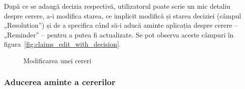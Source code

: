 	După ce se adaugă decizia respectivă, utilizatorul poate scrie un mic detaliu despre cerere, a-i modifica starea, ce implicit modifică și starea deciziei (câmpul „Resolution”) și de a specifica când să-i aducă aminte aplicația despre cerere -- „Reminder” -- pentru a putea fi actualizate.
	Se pot observa aceste câmpuri în figura~\ref{fig:claims_edit_with_decision}.
	\begin{figure}
		\centering
		\caption{Modificarea unei cereri}
	\end{figure}

	\subsubsection{Aducerea aminte a cererilor}

